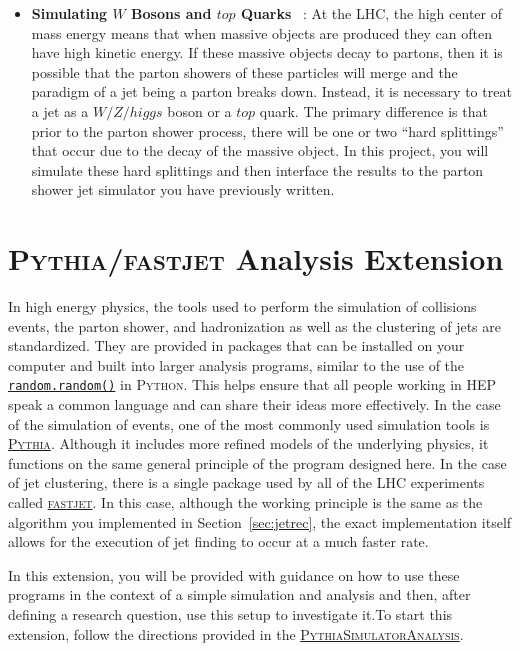 \documentclass[UKenglish,texlive=2016]{\ATLASLATEXPATH atlasdoc}
\begin{document}
\begin{itemize}
\item \textbf{Simulating $W$ Bosons and $top$ Quarks}~\cite{Aad:2015rpa,Schaetzel:2014kha} : At the LHC, the high center of mass energy means that when massive objects are produced they can often have high kinetic energy.  If these massive objects decay to partons, then it is possible that the parton showers of these particles will merge and the paradigm of a jet being a parton breaks down.  Instead, it is necessary to treat a jet as a $W/Z/higgs$ boson or a $top$ quark.  The primary difference is that prior to the parton shower process, there will be one or two ``hard splittings'' that occur due to the decay of the massive object.  In this project, you will simulate these hard splittings and then interface the results to the parton shower jet simulator you have previously written.
\end{itemize}

\section{\textsc{Pythia}/\textsc{fastjet} Analysis Extension}
\label{sec:ext2}
In high energy physics, the tools used to perform the simulation of collisions events, the parton shower, and hadronization as well as the clustering of jets are standardized.  They are provided in packages that can be installed on your computer and built into larger analysis programs, similar to the use of the \href{https://docs.python.org/2/library/random.html}{\texttt{random.random()}} in \textsc{Python}.  This helps ensure that all people working in HEP speak a common language and can share their ideas more effectively.  In the case of the simulation of events, one of the most commonly used simulation tools is \href{home.thep.lu.se/~torbjorn/pythia81html/Welcome.html}{\textsc{Pythia}}.  Although it includes more refined models of the underlying physics, it functions on the same general principle of the program designed here.  In the case of jet clustering, there is a single package used by all of the LHC experiments called \href{fastjet.fr}{\textsc{fastjet}}.  In this case, although the working principle is the same as the algorithm you implemented in Section~\ref{sec:jetrec}, the exact implementation itself allows for the execution of jet finding to occur at a much faster rate.

In this extension, you will be provided with guidance on how to use these programs in the context of a simple simulation and analysis and then, after defining a research question, use this setup to investigate it.To start this extension, follow the directions provided in the \href{https://github.com/smeehan12/PythiaSimulatorAnalysis}{\textsc{PythiaSimulatorAnalysis}}.





\printbibliography
\end{document}
